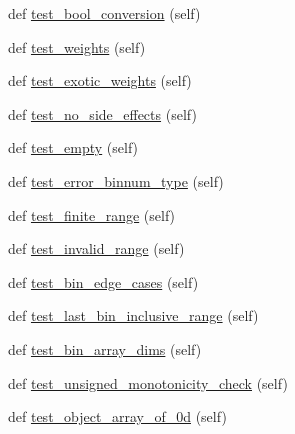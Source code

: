 \begin{DoxyCompactItemize}
\item 
def \hyperlink{classnumpy_1_1lib_1_1tests_1_1test__histograms_1_1TestHistogram_a401bdb3c1f039915acb8addcef432499}{test\+\_\+bool\+\_\+conversion} (self)
\item 
def \hyperlink{classnumpy_1_1lib_1_1tests_1_1test__histograms_1_1TestHistogram_af26792bdbc39d2880688622a7ad6a5d2}{test\+\_\+weights} (self)
\item 
def \hyperlink{classnumpy_1_1lib_1_1tests_1_1test__histograms_1_1TestHistogram_aedafdc593fca50f7acc9e950f127e68d}{test\+\_\+exotic\+\_\+weights} (self)
\item 
def \hyperlink{classnumpy_1_1lib_1_1tests_1_1test__histograms_1_1TestHistogram_a894260a204bf1aa7f83325c84b565f3f}{test\+\_\+no\+\_\+side\+\_\+effects} (self)
\item 
def \hyperlink{classnumpy_1_1lib_1_1tests_1_1test__histograms_1_1TestHistogram_a212854c222e727e295aee188c713d2c9}{test\+\_\+empty} (self)
\item 
def \hyperlink{classnumpy_1_1lib_1_1tests_1_1test__histograms_1_1TestHistogram_afe16440c5d1489bed7e680135faca458}{test\+\_\+error\+\_\+binnum\+\_\+type} (self)
\item 
def \hyperlink{classnumpy_1_1lib_1_1tests_1_1test__histograms_1_1TestHistogram_acb38f00ac4ca10148503d1f72694bbe7}{test\+\_\+finite\+\_\+range} (self)
\item 
def \hyperlink{classnumpy_1_1lib_1_1tests_1_1test__histograms_1_1TestHistogram_a70a3767caf794d499da2728f1595a306}{test\+\_\+invalid\+\_\+range} (self)
\item 
def \hyperlink{classnumpy_1_1lib_1_1tests_1_1test__histograms_1_1TestHistogram_a70aa5ffec5dae4c1e13cc9b2351d04f6}{test\+\_\+bin\+\_\+edge\+\_\+cases} (self)
\item 
def \hyperlink{classnumpy_1_1lib_1_1tests_1_1test__histograms_1_1TestHistogram_a7914c96adab3264bde14c95c0ccdd7c9}{test\+\_\+last\+\_\+bin\+\_\+inclusive\+\_\+range} (self)
\item 
def \hyperlink{classnumpy_1_1lib_1_1tests_1_1test__histograms_1_1TestHistogram_a45cd22ef5788a7e97d3da607baeb9303}{test\+\_\+bin\+\_\+array\+\_\+dims} (self)
\item 
def \hyperlink{classnumpy_1_1lib_1_1tests_1_1test__histograms_1_1TestHistogram_a4b9223bf6217cd46af076a053dafc978}{test\+\_\+unsigned\+\_\+monotonicity\+\_\+check} (self)
\item 
def \hyperlink{classnumpy_1_1lib_1_1tests_1_1test__histograms_1_1TestHistogram_a2c893b50c871c77bb47a12d365faf99d}{test\+\_\+object\+\_\+array\+\_\+of\+\_\+0d} (self)

\end{DoxyCompactItemize}
